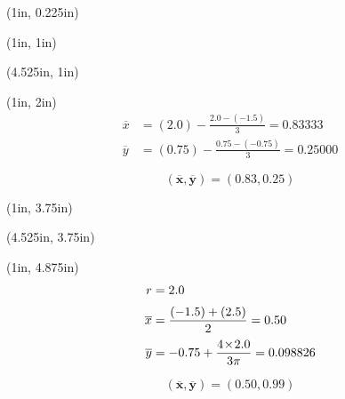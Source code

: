 \documentclass[10pt,oneside]{article}
\def\scale{1}
\begin{document}

\begin{textblock*}{6.775in}(1in, 0.225in)
\end{textblock*}

\begin{textblock*}{3in}(1in, 1in)
\end{textblock*}
\begin{textblock*}{3.25in}(4.525in, 1in)
	\cbox{
		\centering
		\def\scale{1}
		
	}
\end{textblock*}


\begin{textblock*}{3in}(1in, 2in)
	\large
	\begin{align*}
		\overline{x} &= (2.0)-\frac{2.0-(-1.5)}{3}=0.83333 \\[0.25em]
		\overline{y} &= (0.75)-\frac{0.75-(-0.75)}{3}=0.25000		
	\end{align*}
	\par
	$$ \bm{\left(\overline{x},\overline{y}\right) = (0.83, 0.25)} $$
\end{textblock*}



\begin{textblock*}{3in}(1in, 3.75in)
\end{textblock*}
\begin{textblock*}{3.25in}(4.525in, 3.75in)
	\cbox{
		\centering
		\def\scale{1}
		
	}
\end{textblock*}
\begin{textblock*}{3in}(1in, 4.875in)
	\large
	\begin{align*}
		r &= 2.0 \\[0.25em]
		\overline{x} &= \frac{(-1.5)+(2.5)}{2}=0.50 \\[0.25em]
		\overline{y} &= -0.75+\frac{4\!\times\!2.0}{3\pi}=0.098826
	\end{align*}
	\par
	$$ \bm{\left(\overline{x},\overline{y}\right) = (0.50, 0.99)} $$
\end{textblock*}
\end{document}
